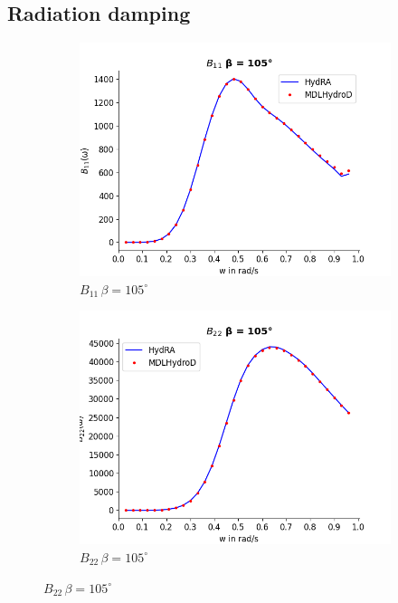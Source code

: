 \subsection{Radiation damping}
\begin{figure}[H]
    \centering
    \begin{subfigure}[b]{0.49\textwidth}
        \includegraphics[width=\textwidth]{plots/kcs/rad_damp/b11.png}
        \caption{$B_{11} \, \beta = 105^{\circ}$}
    \end{subfigure}
    \begin{subfigure}[b]{0.49\textwidth}
        \includegraphics[width=\textwidth]{plots/kcs/rad_damp/b22.png}
        \caption{$B_{22} \, \beta = 105^{\circ}$}
    \end{subfigure}

\end{figure}
